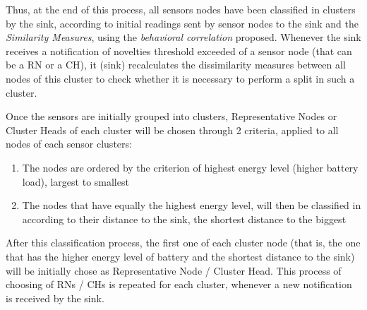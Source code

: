 \documentclass[conference]{IEEEtran}
\begin{document}

Thus, at the end of this process, all sensors nodes have been classified in
clusters by the sink, according to initial readings sent by sensor nodes to the
sink and the \textit{Similarity Measures}, using the \textit{behavioral
correlation} proposed. Whenever the sink receives a notification of novelties
threshold exceeded of a sensor node (that can be a RN or a CH), it (sink)
recalculates the dissimilarity measures between all nodes of this cluster to
check whether it is necessary to perform a split in such a cluster.

Once the sensors are initially grouped into clusters, Representative Nodes or
Cluster Heads of each cluster will be chosen through 2 criteria, applied to all
nodes of each sensor clusters:
\begin{enumerate}
    \item The nodes are ordered by the criterion of highest energy level (higher
    battery load), largest to smallest
    \item The nodes that have equally the highest energy level, will then be
    classified in according to their distance to the sink, the shortest distance
    to the biggest
 \end{enumerate}


After this classification process, the first one of each cluster node (that is,
the one that has the higher energy level of battery and the shortest distance to
the sink) will be initially chose as Representative Node / Cluster Head. This
process of choosing of RNs / CHs is repeated for each cluster, whenever a new
notification is received by the sink.
\end{document}
